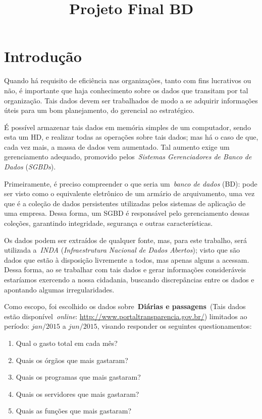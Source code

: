 \documentclass [12pt]{article}
\title {Projeto Final BD}
\begin{document}
	\inserirTitulo
	
	\section{Introdução}
		\label{sec:intro}
	Quando há requisito de eficiência nas organizações, tanto com fins lucrativos ou não, é importante que haja conhecimento sobre os dados que transitam por tal organização. Tais dados devem ser trabalhados de modo a se adquirir informações úteis para um bom planejamento, do gerencial ao estratégico.
	
	É possível armazenar tais dados em memória simples de um computador, sendo esta um HD, e realizar todas as operações sobre tais dados; mas há o caso de que, cada vez mais, a massa de dados vem aumentado. Tal aumento exige um gerenciamento adequado, promovido pelos~\emph{Sistemas Gerenciadores de Banco de Dados} (\emph{SGBDs}).
	
	Primeiramente, é preciso compreender o que seria um~\emph{banco de dados} (BD): pode ser visto como o equivalente eletrônico de um armário de arquivamento, uma vez que é a coleção de dados persistentes utilizadas pelos sistemas de aplicação de uma empresa. Dessa forma, um SGBD é responsável pelo gerenciamento dessas coleções, garantindo integridade, segurança e outras características.

	Os dados podem ser extraídos de qualquer fonte, mas, para este trabalho, será utilizada a~\emph{INDA} (\emph{Infraestrutura Nacional de Dados Abertos}); visto que são dados que estão à disposição livremente a todos, mas apenas alguns a acessam. Dessa forma, ao se trabalhar com tais dados e gerar informações consideráveis estaríamos exercendo a nossa cidadania, buscando discrepâncias entre os dados e apontando algumas irregularidades.
	
	Como escopo, foi escolhido os dados sobre~\textbf{Diárias e passagens}~(Tais dados estão disponível~\emph{online}: \url{http://www.portaltransparencia.gov.br/}) limitados ao período: $jan/2015$ a $jun/2015$, visando responder os seguintes questionamentos:
	
	\begin{enumerate}
		\item Qual o gasto total em cada mês?
		\item Quais os órgãos que mais gastaram?
		\item Quais os programas que mais gastaram?
		\item Quais os servidores que mais gastaram?
		\item Quais as funções que mais gastaram?
	\end{enumerate}
\end{document}
